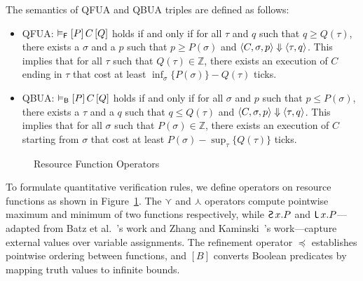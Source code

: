 \begin{definition}
  The semantics of QFUA and QBUA triples are defined as follows:
  \begin{itemize}
    \item QFUA: $\vDash_{\mathsf{F}}\left[P\right]C\left[Q\right]$ holds if and only if for all $\tau$ and $q$ such that $q\ge Q(\tau)$, there exists a $\sigma$ and a $p$ such that $p\ge P(\sigma)$ and $\left\langle C,\sigma,p\right\rangle\Downarrow\left\langle\tau,q\right\rangle$. This implies that for all $\tau$ such that $Q(\tau)\in\mathbb{Z}$, there exists an execution of $C$ ending in $\tau$ that cost at least $\inf_\sigma\{P(\sigma)\}-Q(\tau)$ ticks.
    \item QBUA: $\vDash_{\mathsf{B}}\left[P\right]C\left[Q\right]$ holds if and only if for all $\sigma$ and $p$ such that $p\le P(\sigma)$, there exists a $\tau$ and a $q$ such that $q\le Q(\tau)$ and $\left\langle C,\sigma,p\right\rangle\Downarrow\left\langle\tau,q\right\rangle$. This implies that for all $\sigma$ such that $P(\sigma)\in\mathbb{Z}$, there exists an execution of $C$ starting from $\sigma$ that cost at least $P(\sigma)-\sup_\tau\{Q(\tau)\}$ ticks.
  \end{itemize}
\end{definition}

\begin{figure}[t!]
\caption{Resource Function Operators}
\label{fig:operators}
\end{figure}

To formulate quantitative verification rules, we define operators on resource functions as shown in Figure~\ref{fig:operators}. The $\curlyvee$ and $\curlywedge$ operators compute pointwise maximum and minimum of two functions respectively, while $\Sup x.P$ and $\Inf x.P$---adapted from Batz et al.~\cite{POPL:BKK21}'s work and Zhang and Kaminski~\cite{OOPSLA:ZK22}'s work---capture external values over variable assignments. The refinement operator $\preceq$ establishes pointwise ordering between functions, and $[B]$ converts Boolean predicates by mapping truth values to infinite bounds.

